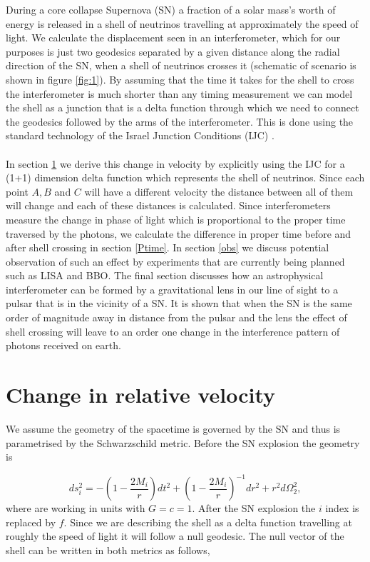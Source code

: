 \documentclass[aps,showpacs,twocolumn,floats,prd,superscriptaddress,nofootinbib]{revtex4-1}
\begin{document}
During a core collapse Supernova (SN) a fraction of a solar mass's worth of energy is released in a shell of neutrinos travelling at approximately the speed of light. We calculate the displacement seen in an interferometer, which for our purposes is just two geodesics separated by a given distance along the radial direction of the SN, when a shell of neutrinos crosses it (schematic of scenario is shown in figure \ref{fig:1}). By assuming that the time it takes for the shell to cross the interferometer is much shorter than any timing measurement we can model the shell as a junction that is a delta function through which we need to connect the geodesics followed by the arms of the interferometer. This is done using the standard technology of the Israel Junction Conditions (IJC) \cite{Isr66}. 
\\
\\
In section \ref{RelV} we derive this change in velocity by explicitly using the IJC for a (1+1) dimension delta function which represents the shell of neutrinos. Since each point $A,B$ and $C$ will have a different velocity the distance between all of them will change and each of these distances is calculated. Since interferometers measure the change in phase of light which is proportional to the proper time traversed by the photons, we calculate the difference in proper time before and after shell crossing in section \ref{Ptime}. In section \ref{obs} we discuss potential observation of such an effect by experiments that are currently being planned such as LISA and BBO. The final section discusses how an astrophysical interferometer can be formed by a gravitational lens in our line of sight to a pulsar that is in the vicinity of a SN. It is shown that when the SN is the same order of magnitude away in distance from the pulsar and the lens the effect of shell crossing will leave to an order one change in the interference pattern of photons received on earth. 
\section{Change in relative velocity}
\label{RelV}

We assume the geometry of the spacetime is governed by the SN and thus is parametrised by the Schwarzschild metric. Before the SN explosion the geometry is

\begin{equation}
	ds^2_i = - \left( 1 - \frac{2M_i}{r} \right) dt^2 + \left( 1 - \frac{2M_i}{r} \right)^{-1} dr^2 + r^2 d \Omega_2^2,
\end{equation}
where are working in units with $G = c =1$. After the SN explosion the $i$ index is replaced by $f$. Since we are describing the shell as a delta function travelling at roughly the speed of light it will follow a null geodesic. The null vector of the shell can be written in both metrics as follows,
\end{document}
